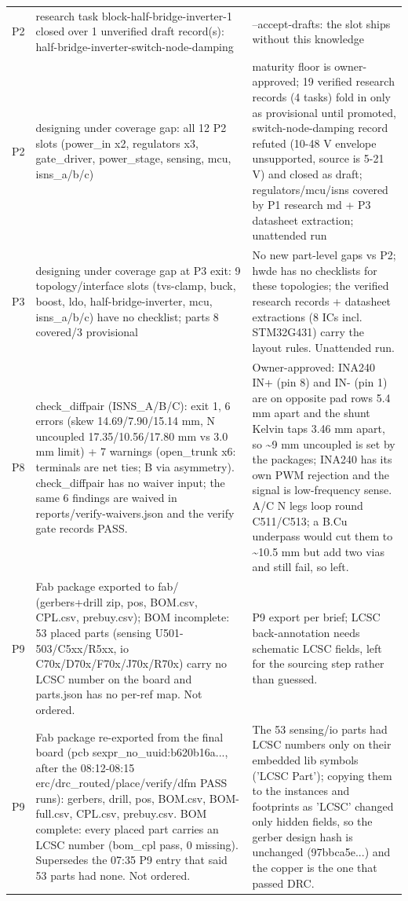 \documentclass[11pt,a4paper]{article}
\begin{document}
{\begin{longtable}{lp{5.2cm}p{7.2cm}}
P2 & research task block-half-bridge-inverter-1 closed over 1 unverified draft record(s): half-bridge-inverter-switch-node-damping & --accept-drafts: the slot ships without this knowledge \\
P2 & designing under coverage gap: all 12 P2 slots (power\_in x2, regulators x3, gate\_driver, power\_stage, sensing, mcu, isns\_a/b/c) & maturity floor is owner-approved; 19 verified research records (4 tasks) fold in only as provisional until promoted, switch-node-damping record refuted (10-48 V envelope unsupported, source is 5-21 V) and closed as draft; regulators/mcu/isns covered by P1 research md + P3 datasheet extraction; unattended run \\
P3 & designing under coverage gap at P3 exit: 9 topology/interface slots (tvs-clamp, buck, boost, ldo, half-bridge-inverter, mcu, isns\_a/b/c) have no checklist; parts 8 covered/3 provisional & No new part-level gaps vs P2; hwde has no checklists for these topologies; the verified research records + datasheet extractions (8 ICs incl. STM32G431) carry the layout rules. Unattended run. \\
P8 & check\_diffpair (ISNS\_A/B/C): exit 1, 6 errors (skew 14.69/7.90/15.14 mm, N uncoupled 17.35/10.56/17.80 mm vs 3.0 mm limit) + 7 warnings (open\_trunk x6: terminals are net ties; B via asymmetry). check\_diffpair has no waiver input; the same 6 findings are waived in reports/verify-waivers.json and the verify gate records PASS. & Owner-approved: INA240 IN+ (pin 8) and IN- (pin 1) are on opposite pad rows 5.4 mm apart and the shunt Kelvin taps 3.46 mm apart, so \textasciitilde{}9 mm uncoupled is set by the packages; INA240 has its own PWM rejection and the signal is low-frequency sense. A/C N legs loop round C511/C513; a B.Cu underpass would cut them to \textasciitilde{}10.5 mm but add two vias and still fail, so left. \\
P9 & Fab package exported to fab/ (gerbers+drill zip, pos, BOM.csv, CPL.csv, prebuy.csv); BOM incomplete: 53 placed parts (sensing U501-503/C5xx/R5xx, io C70x/D70x/F70x/J70x/R70x) carry no LCSC number on the board and parts.json has no per-ref map. Not ordered. & P9 export per brief; LCSC back-annotation needs schematic LCSC fields, left for the sourcing step rather than guessed. \\
P9 & Fab package re-exported from the final board (pcb sexpr\_no\_uuid:b620b16a..., after the 08:12-08:15 erc/drc\_routed/place/verify/dfm PASS runs): gerbers, drill, pos, BOM.csv, BOM-full.csv, CPL.csv, prebuy.csv. BOM complete: every placed part carries an LCSC number (bom\_cpl pass, 0 missing). Supersedes the 07:35 P9 entry that said 53 parts had none. Not ordered. & The 53 sensing/io parts had LCSC numbers only on their embedded lib symbols ('LCSC Part'); copying them to the instances and footprints as 'LCSC' changed only hidden fields, so the gerber design hash is unchanged (97bbca5e...) and the copper is the one that passed DRC. \\
\bottomrule
\end{longtable}
}
\end{document}
